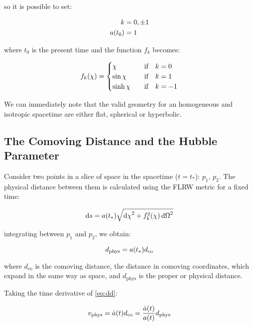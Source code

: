 so it is possible to set:

\begin{align}
k & = 0,\pm 1 \\
a\qty(t_0) & = 1
\end{align}

where $t_0$ is the present time and the function $f_k$ becomes:

        \begin{equation}
                f_k\qty(\chi) =
                        \begin{cases}
                                 \chi & \qif k = 0 \\
                                 \sin \chi & \qif k = 1 \\
                                 \sinh \chi & \qif k = -1
                        \end{cases}
        \end{equation}

We can immediately note that the valid geometry for an homogeneous
and isotropic spacetime are either flat, spherical or hyperbolic.

\subsection{The Comoving Distance and the Hubble Parameter}

Consider two points in a slice of space in the spacetime ($t = t_*$): $p_1$,
$p_2$. The physical distance between them is calculated using the FLRW
metric for a fixed time:

\begin{equation}
        \dd{s} = a\qty(t_*)\sqrt{\dd{\chi}^2 +
        f_k^2\qty(\chi)\dd{\Omega}^2}
\end{equation}

integrating between $p_1$ and $p_2$, we obtain:

\begin{equation}
        d_{\text{phys}} = a\qty(t_*)d_{\text{co}}
        \label{eq:dd}
\end{equation}

where $d_{\text{co}}$ is the comoving distance, the distance in comoving
coordinates, which expand in the same way as space, and $d_\text{phys}$ is
the proper or physical distance.

Taking the time derivative of \autoref{eq:dd}:

\begin{equation}
        v_{\text{phys}} = \dot a\qty(t) d_{\text{co}} = \frac{\dot a\qty(t)}{a\qty(t)} d_{\text{phys}}
\end{equation}

